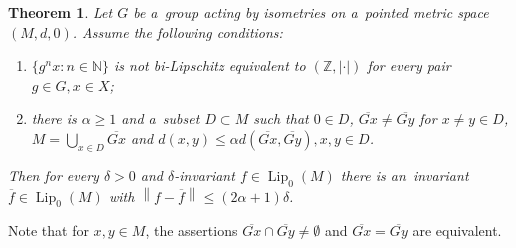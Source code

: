 \documentclass[11pt,a4paper]{amsart}
\newtheorem{theorem}{Theorem}[section]
\theoremstyle{definition}
\newcommand{\Z}{\mathbb{Z}}
\newcommand{\N}{\mathbb{N}}
\newcommand{\fBar}{\overline{f}}
\newcommand{\abs}[1]{\left| #1 \right|}
\newcommand{\norm}[1]{\left\| #1 \right\|}
\newcommand{\Lipz}{\operatorname{Lip}_0}
\begin{document}
	\begin{theorem} \label{thm:badGroup}
		Let $G$ be a~group acting by isometries on a~pointed metric space $(M, d, 0)$. Assume the following conditions:
		\begin{enumerate}
			\item $\{g^n x : n \in \N\}$ is not bi-Lipschitz equivalent to $(\Z, \abs{\cdot})$ for every pair $g \in G, x \in X$;
			\item there is $\alpha \geq 1$ and a~subset $D \subset M$ such that $0 \in D$, $\overline{Gx} \neq \overline{Gy}$ for $x \neq y \in D$, $M = \bigcup_{x \in D} \overline{Gx}$ and $d(x, y) \leq \alpha d(\overline{Gx}, \overline{Gy}), x, y \in D$.
		\end{enumerate}
		Then for every $\delta > 0$ and $\delta$-invariant $f \in \Lipz(M)$ there is an~invariant $\fBar \in \Lipz(M)$ with $\norm{f - \fBar} \leq (2\alpha + 1)\delta$.
	\end{theorem}
	Note that for $x, y \in M$, the assertions $\overline{Gx} \cap \overline{Gy} \neq \emptyset$ and $\overline{Gx} = \overline{Gy}$ are equivalent.
\end{document}
